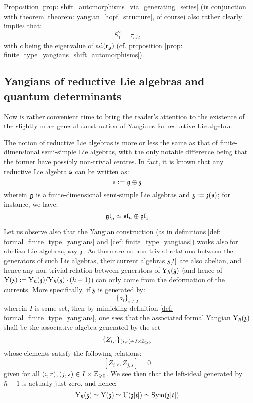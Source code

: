         \begin{remark}
            Proposition \ref{prop: shift_automorphisms_via_generating_series} (in conjunction with theorem \ref{theorem: yangian_hopf_structure}, of course) also rather clearly implies that:
                $$S_1^2 = \tau_{c/2}$$
            with $c$ being the eigenvalue of $\mathrm{ad}(\mathsf{r}_{\mathfrak{g}})$ (cf. proposition \ref{prop: finite_type_yangians_shift_automorphisms}).
        \end{remark}

    \subsection{Yangians of reductive Lie algebras and quantum determinants} \label{subsection: yangians_of_reductive_lie_algebras}
        Now is rather convenient time to bring the reader's attention to the existence of the slightly more general construction of Yangians for reductive Lie algebra.

        The notion of reductive Lie algebras is more or less the same as that of finite-dimensional semi-simple Lie algebras, with the only notable difference being that the former have possibly non-trivial centres. In fact, it is known that any reductive Lie algebra $\mathfrak{s}$ can be written as:
            $$\mathfrak{s} := \mathfrak{g} \oplus \mathfrak{z}$$
        wherein $\mathfrak{g}$ is a finite-dimensional semi-simple Lie algebras and $\mathfrak{z} := \mathfrak{z}(\mathfrak{s})$; for instance, we have:
            $$\mathfrak{gl}_n \simeq \mathfrak{sl}_n \oplus \mathfrak{gl}_1$$

        Let us observe also that the Yangian construction (as in definitions \ref{def: formal_finite_type_yangians} and \ref{def: finite_type_yangians}) works also for abelian Lie algebras, say $\mathfrak{z}$. As there are no non-trivial relations between the generators of such Lie algebras, their current algebras $\mathfrak{z}[t]$ are also abelian, and hence any non-trivial relation between generators of $\mathrm{Y}_{\hbar}(\mathfrak{z})$ (and hence of $\mathrm{Y}(\mathfrak{z}) := \mathrm{Y}_{\hbar}(\mathfrak{z})/\mathrm{Y}_{\hbar}(\mathfrak{z}) \cdot (\hbar - 1)$) can only come from the deformation of the currents. More specifically, if $\mathfrak{z}$ is generated by:
            $$\{z_i\}_{i \in I}$$
        wherein $I$ is some set, then by mimicking definition \ref{def: formal_finite_type_yangians}, one sees that the associated formal Yangian $\mathrm{Y}_{\hbar}(\mathfrak{z})$ shall be the associative algebra generated by the set:
            $$\{Z_{i, r}\}_{(i, r) \in I \x \Z_{\geq 0}}$$
        whose elements satisfy the following relations:
            $$[ Z_{i, r}, Z_{j, s} ] = 0$$
        given for all $(i, r), (j, s) \in I \x \Z_{\geq 0}$. We see then that the left-ideal generated by $\hbar - 1$ is actually just zero, and hence:
            $$\mathrm{Y}_{\hbar}(\mathfrak{z}) \simeq \mathrm{Y}(\mathfrak{z}) \simeq \mathrm{U}(\mathfrak{z}[t]) \simeq \mathrm{Sym}(\mathfrak{z}[t])$$

